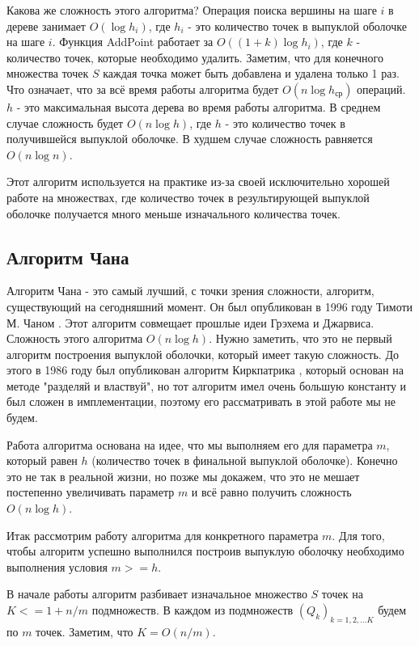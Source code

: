 Какова же сложность этого алгоритма? Операция поиска вершины на шаге $i$ в дереве занимает $O(\log h_i)$, где $h_i$ - это количество точек в выпуклой оболочке на шаге $i$. Функция AddPoint работает за $O((1+k) \log h_i)$, где $k$ - количество точек, которые необходимо удалить. Заметим, что для конечного множества точек $S$ каждая точка может быть добавлена и удалена только 1 раз. Что означает, что за всё время работы алгоритма будет $O(n \log h_{ср})$ операций. $h$ - это максимальная высота дерева во время работы алгоритма. В среднем случае сложность будет $O(n \log h)$, где $h$ - это количество точек в получившейся выпуклой оболочке. В худшем случае сложность равняется $O(n \log n)$.

Этот алгоритм используется на практике из-за своей исключительно хорошей работе на множествах, где количество точек в результирующей выпуклой оболочке получается много меньше изначального количества точек.

\subsection{Алгоритм Чана} \label{subsect1_1_6}


Алгоритм Чана - это самый лучший, с точки зрения сложности, алгоритм, существующий на сегодняшний момент. Он был опубликован в 1996 году Тимоти М. Чаном \cite{chan1996Chan}. Этот алгоритм совмещает прошлые идеи Грэхема и Джарвиса. Сложность этого алгоритма $O(n \log h)$. Нужно заметить, что это не первый алгоритм построения выпуклой оболочки, который имеет такую сложность. До этого в 1986 году был опубликован алгоритм Киркпатрика \cite{kirkpatrick1986ultimate}, который основан на методе "разделяй и властвуй", но тот алгоритм имел очень большую константу и был сложен в имплементации, поэтому его рассматривать в этой работе мы не будем.

Работа алгоритма основана на идее, что мы выполняем его для параметра $m$, который равен $h$ (количество точек в финальной выпуклой оболочке). Конечно это не так в реальной жизни, но позже мы докажем, что это не мешает постепенно увеличивать параметр $m$ и всё равно получить сложность $O(n \log h)$.

Итак рассмотрим работу алгоритма для конкретного параметра $m$. Для того, чтобы алгоритм успешно выполнился построив выпуклую оболочку необходимо выполнения условия $m >= h$.

В начале работы алгоритм разбивает изначальное множество $S$ точек на $K <= 1 + n / m$ подмножеств. В каждом из подмножеств $(Q_k)_{k=1,2,...K}$ будем по $m$ точек. Заметим, что $K = O(n / m)$.

